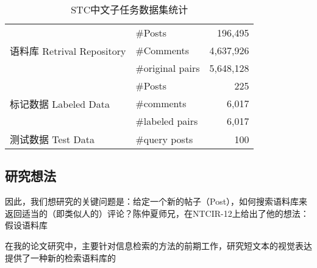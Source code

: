 \begin{table}[htbp]
\centering
\caption{STC中文子任务数据集统计} \label{tab:statistics_STC}
\begin{tabular}{|p{4cm}|l|r|}
    \hline
    \multirow{3}{4cm}{语料库 \linebreak Retrival Repository} & \#Posts & 196,495 \\ 
	\cline{2-3}
	& \#Comments & 4,637,926 \\ 
	\cline{2-3}
	& \#original pairs & 5,648,128 \\ 
	\hline
	\multirow{3}{4cm}{标记数据 \linebreak Labeled Data} & \#Posts & 225 \\ 
	\cline{2-3}
	& \#comments & 6,017 \\ 
	\cline{2-3}
	& \#labeled pairs & 6,017 \\ 
	\hline
	测试数据 Test Data & \#query posts & 100 \\
	\hline
\end{tabular}
\end{table}
	
	

\subsection{研究想法}
因此，我们想研究的关键问题是：给定一个新的帖子（Post），如何搜索语料库来返回适当的（即类似人的）评论？陈仲夏师兄，在NTCIR-12上给出了他的想法：假设语料库

在我的论文研究中，主要针对信息检索的方法的前期工作，研究短文本的视觉表达提供了一种新的检索语料库的




